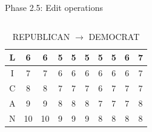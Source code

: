 \documentclass[aspectratio=1610, xcolor=table]{beamer}
\begin{document}
\begin{frame}[fragile]{Phase 2.5: Edit operations}
\begin{columns}
{\begin{table}
\begin{center}
\begin{tabular}[c]{c|c|c|c|c|c|c|c|c|c|}
						L & 6                    & 6                    & 5                    & 5                    & \cellcolor{blue!25}5 & 5                    & 5                    & 6                    & 7                    \\\hline
						I & 7                    & 7                    & 6                    & 6                    & 6                    & \cellcolor{blue!25}6 & 6                    & 6                    & 7                    \\\hline
						C & 8                    & 8                    & 7                    & 7                    & 7                    & 6                    & \cellcolor{blue!25}7 & 7                    & 7                    \\\hline
						A & 9                    & 9                    & 8                    & 8                    & 8                    & 7                    & 7                    & \cellcolor{blue!25}7 & 8                    \\\hline
						N & 10                   & 10                   & 9                    & 9                    & 9                    & 8                    & 8                    & 8                    & \cellcolor{blue!25}8 \\\hline

						\hline
					\end{tabular}
				\end{center}
				\caption{REPUBLICAN $\rightarrow$ DEMOCRAT}
				\label{tab:wagnerfischermatrix}
			\end{table}
		}
	\end{columns}
\end{frame}
\end{document}
